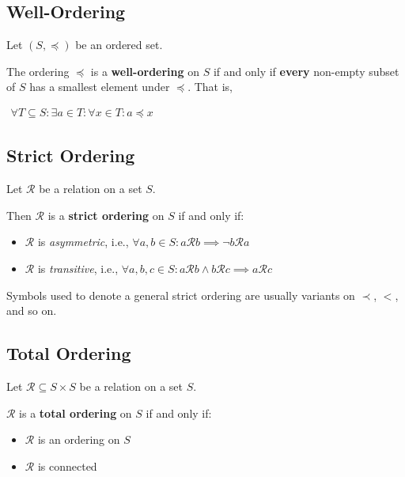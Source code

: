 \subsection{Well-Ordering}

Let $(S, \preceq)$ be an ordered set.

The ordering $\preceq$ is a \textbf{well-ordering} on $S$ if and only
if \textbf{every} non-empty subset of $S$ has a smallest element under
$\preceq$. That is,


\begin{math}
  \begin{array}{c}
    \forall T \subseteq S: \exists a \in T : \forall x \in T : a \preceq
    x
  \end{array}
\end{math}

\subsection{Strict Ordering}
\label{sec:strict-ordering}

Let $\mathcal{R}$ be a relation on a set $S$.

Then $\mathcal{R}$ is a \textbf{strict ordering} on $S$ if and only
if:

\begin{itemize}
\item $\mathcal{R}$ is \textit{asymmetric}, i.e.,
  $\forall a, b \in S : a \mathcal{R} b \implies \neg b \mathcal{R} a$
\item $\mathcal{R}$ is \textit{transitive}, i.e.,
  $\forall a, b, c \in S: a \mathcal{R} b \land b \mathcal{R} c
  \implies a \mathcal{R} c$
\end{itemize}

Symbols used to denote a general strict ordering are usually variants
on $\prec$, $<$, and so on.


\subsection{Total Ordering}

Let $\mathcal{R} \subseteq S \times S$ be a relation on a set $S$.

$\mathcal{R}$ is a \textbf{total ordering} on $S$ if and only if:

\begin{itemize}
\item $\mathcal{R}$ is an ordering on $S$
\item $\mathcal{R}$ is connected
\end{itemize}

